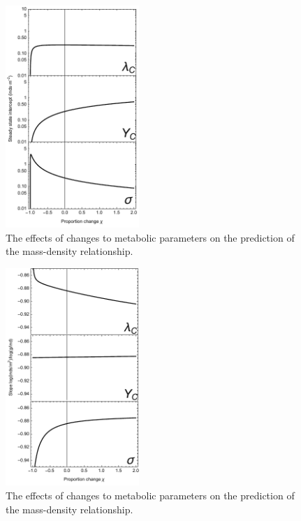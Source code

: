 \documentclass[]{rsos}%
\begin{document}
\begin{figure}
  \centering
\includegraphics[width=0.45\textwidth]{fig_intmod.pdf}
\caption{The effects of changes to metabolic parameters on the prediction of the mass-density relationship.}
\label{fig:corr1}
\end{figure}

\begin{figure}
  \centering
  \includegraphics[width=0.45\textwidth]{fig_slopemod.pdf}
  \caption{The effects of changes to metabolic parameters on the prediction of the mass-density relationship.}
  \label{fig:corr2}
\end{figure}
  
\end{document}
